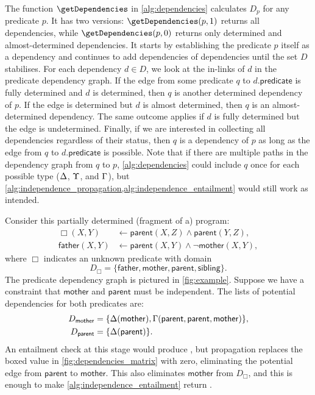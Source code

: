 The function $\getDependencies$ in \cref{alg:dependencies} calculates $D_p$ for
any predicate $p$. It has two versions: $\getDependencies(p, 1)$ returns all
dependencies, while $\getDependencies(p, 0)$ returns only determined and
almost-determined dependencies. It starts by establishing the predicate $p$
itself as a dependency and continues to add dependencies of dependencies until
the set $D$ stabilises. For each dependency $d \in D$, we look at the in-links
of $d$ in the predicate dependency graph. If the edge from some predicate $q$ to
$d.\mathsf{predicate}$ is fully determined and $d$ is determined, then $q$ is
another determined dependency of $p$. If the edge is determined but $d$ is
almost determined, then $q$ is an almost-determined dependency. The same outcome
applies if $d$ is fully determined but the edge is undetermined. Finally, if we
are interested in collecting all dependencies regardless of their status, then
$q$ is a dependency of $p$ as long as the edge from $q$ to
$d.\mathsf{predicate}$ is possible. Note that if there are multiple paths in the
dependency graph from $q$ to $p$, \cref{alg:dependencies} could include $q$ once
for each possible type ($\operatorname{\Delta}$, $\operatorname{\Upsilon}$, and
$\operatorname{\Gamma}$), but
\cref{alg:independence_propagation,alg:independence_entailment} would still work
as intended.

\begin{example} \label{example:independence}
  Consider this partially determined (fragment of a) program:
  \begin{align*}
    \Box(X, Y) &\gets \mathsf{parent}(X, Z) \land \mathsf{parent}(Y, Z),\\
    \mathsf{father}(X, Y) &\gets \mathsf{parent}(X, Y) \land \neg\mathsf{mother}(X, Y),
  \end{align*}
  where $\Box$ indicates an unknown predicate with domain
  \[
    D_\Box = \{ \mathsf{father}, \mathsf{mother}, \mathsf{parent},
    \mathsf{sibling} \}.
  \]
  The predicate dependency graph is pictured in \cref{fig:example}. Suppose we
  have a constraint that $\mathsf{mother}$ and $\mathsf{parent}$ must be
  independent. The lists of potential dependencies for both predicates are:
  \begin{align*}
    D_{\mathsf{mother}} &= \{ \operatorname{\Delta}(\mathsf{mother}), \operatorname{\Gamma}(\mathsf{parent}, \mathsf{parent}, \mathsf{mother}) \}, \\
    D_{\mathsf{parent}} &= \{ \operatorname{\Delta}(\mathsf{parent}) \}.
  \end{align*}
  An entailment check at this stage would produce \undefined{}, but propagation
  replaces the boxed value in \cref{fig:dependencies_matrix} with zero,
  eliminating the potential edge from $\mathsf{parent}$ to $\mathsf{mother}$.
  This also eliminates $\mathsf{mother}$ from $D_\Box$, and this is enough to
  make \cref{alg:independence_entailment} return \true{}.
\end{example}


